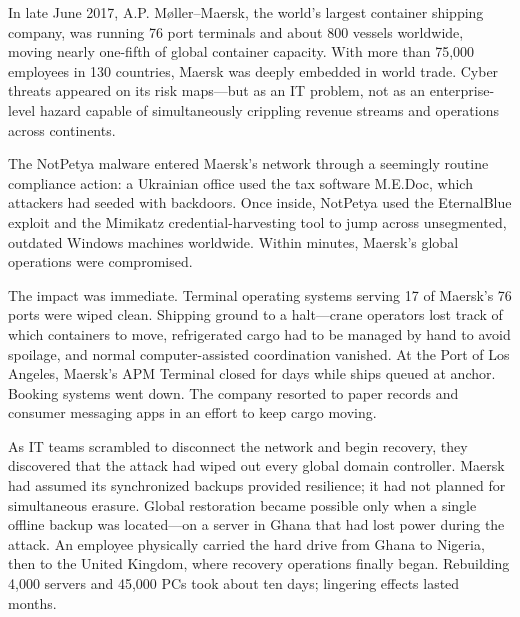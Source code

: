 \documentclass[11pt,openany]{book}
\begin{document}
\clearpage

\begin{corporateexample}

In late June 2017, A.P. M\o ller--Maersk, the world's largest container
shipping company, was running 76 port terminals and about 800 vessels
worldwide, moving nearly one-fifth of global container capacity. With more
than 75{,}000 employees in 130 countries, Maersk was deeply embedded in world
trade. Cyber threats appeared on its risk maps---but as an IT problem, not as
an enterprise-level hazard capable of simultaneously crippling revenue streams
and operations across continents.

The NotPetya malware entered Maersk's network through a seemingly routine
compliance action: a Ukrainian office used the tax software M.E.Doc, which
attackers had seeded with backdoors. Once inside, NotPetya used the
EternalBlue exploit and the Mimikatz credential-harvesting tool to jump across
unsegmented, outdated Windows machines worldwide. Within minutes, Maersk's
global operations were compromised.

The impact was immediate. Terminal operating systems serving 17 of Maersk's
76 ports were wiped clean. Shipping ground to a halt---crane operators lost
track of which containers to move, refrigerated cargo had to be managed by
hand to avoid spoilage, and normal computer-assisted coordination vanished. At
the Port of Los Angeles, Maersk's APM Terminal closed for days while ships
queued at anchor. Booking systems went down. The company resorted to paper
records and consumer messaging apps in an effort to keep cargo moving.

As IT teams scrambled to disconnect the network and begin recovery, they
discovered that the attack had wiped out every global domain controller.
Maersk had assumed its synchronized backups provided resilience; it had not
planned for simultaneous erasure. Global restoration became possible only when
a single offline backup was located---on a server in Ghana that had lost power
during the attack. An employee physically carried the hard drive from Ghana to
Nigeria, then to the United Kingdom, where recovery operations finally began.
Rebuilding 4{,}000 servers and 45{,}000 PCs took about ten days; lingering
effects lasted months.


\end{corporateexample}
\end{document}
